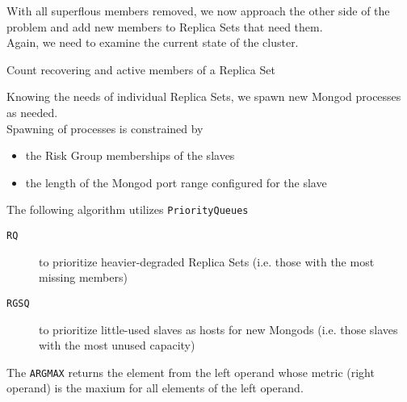 With all superflous members removed, we now approach the other side of the problem
and add new members to Replica Sets that need them.\\
Again, we need to examine the current state of the cluster.

\begin{algorithm}[H]
\caption{Count recovering and active members of a Replica Set}
\label{alg:AlreadyAddedMemberCount}
\BlankLine
{}
\end{algorithm}

Knowing the needs of individual Replica Sets, we spawn new Mongod processes as needed.\\
Spawning of processes is constrained by
\begin{itemize}
  \item the Risk Group memberships of the slaves
  \item the length of the Mongod port range configured for the slave
\end{itemize}

The following algorithm utilizes \texttt{PriorityQueues}
\begin{description}
  \item[\texttt{RQ}] to prioritize heavier-degraded Replica Sets (i.e. those with the most missing members)
  \item[\texttt{RGSQ}] to prioritize little-used slaves as hosts for new Mongods (i.e. those slaves with the most unused capacity)
\end{description} 

The \texttt{ARGMAX} returns the element from the left operand whose metric (right operand) is the maxium for all elements of the left operand.

